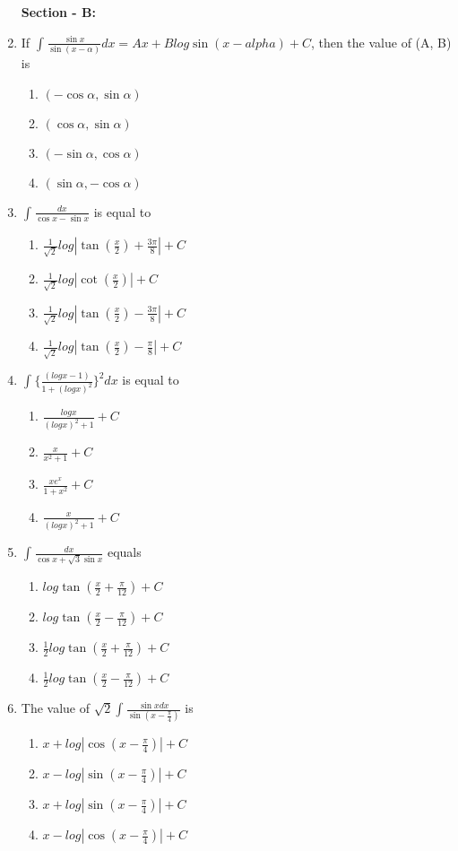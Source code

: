 \begin{enumerate}[label=\arabic*.,ref=\thesubsection.\theenumi]
\textbf{Section - B:}

\item If $\int_{}\frac{\sin x}{\sin(x - \alpha)}dx = Ax + Blog\sin(x - alpha) + C$, then the value of (A, B) is
\begin{enumerate}
\item $(-\cos\alpha, \sin\alpha)$
\item $(\cos\alpha, \sin\alpha)$
\item $(-\sin\alpha, \cos\alpha)$
\item $(\sin\alpha, -\cos\alpha)$
\end{enumerate}

\item $\int_{}\frac{dx}{\cos x - \sin x}$ is equal to
\begin{enumerate}
\item $\frac{1}{\sqrt{2}}log|\tan(\frac{x}{2}) + \frac{3\pi}{8}| + C$
\item $\frac{1}{\sqrt{2}}log|\cot(\frac{x}{2})| + C$
\item $\frac{1}{\sqrt{2}}log|\tan(\frac{x}{2}) - \frac{3\pi}{8}| + C$
\item $\frac{1}{\sqrt{2}}log|\tan(\frac{x}{2}) - \frac{\pi}{8}| + C$
\end{enumerate}

\item $\int_{}\{\frac{(logx - 1)}{1 + (logx)^2}\}^2dx$ is equal to
\begin{enumerate}
\item $\frac{logx}{(logx)^2 + 1} + C$
\item $\frac{x}{x^2 + 1} + C$
\item $\frac{xe^x}{1 + x^2} + C$
\item $\frac{x}{(logx)^2 + 1} + C$
\end{enumerate} 

\item $\int_{}\frac{dx}{\cos x + \sqrt{3}\sin x}$ equals
\begin{enumerate}
\item $log \tan(\frac{x}{2} + \frac{\pi}{12}) + C$
\item $log \tan(\frac{x}{2} - \frac{\pi}{12}) + C$
\item $\frac{1}{2}log \tan(\frac{x}{2} + \frac{\pi}{12}) + C$
\item $\frac{1}{2}log \tan(\frac{x}{2} - \frac{\pi}{12}) + C$
\end{enumerate}

\item The value of $\sqrt{2}\int_{}\frac{\sin xdx}{\sin(x - \frac{\pi}{4})}$ is
\begin{enumerate}
\item $x+log|\cos(x - \frac{\pi}{4})| + C$
\item $x-log|\sin(x - \frac{\pi}{4})| + C$
\item $x+log|\sin(x - \frac{\pi}{4})| + C$
\item $x-log|\cos(x - \frac{\pi}{4})| + C$
\end{enumerate}


\end{enumerate}
